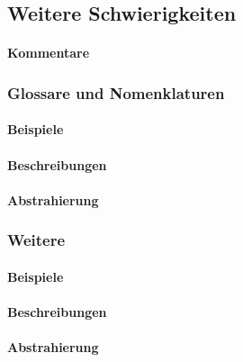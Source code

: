 \subsection{Weitere Schwierigkeiten}\label{problems:additional}
\paragraph*{Kommentare}


\subsubsection{Glossare und Nomenklaturen}
\paragraph*{Beispiele}
\paragraph*{Beschreibungen}
\paragraph*{Abstrahierung}

\subsubsection{Weitere}
\paragraph*{Beispiele}
\paragraph*{Beschreibungen}
\paragraph*{Abstrahierung}
